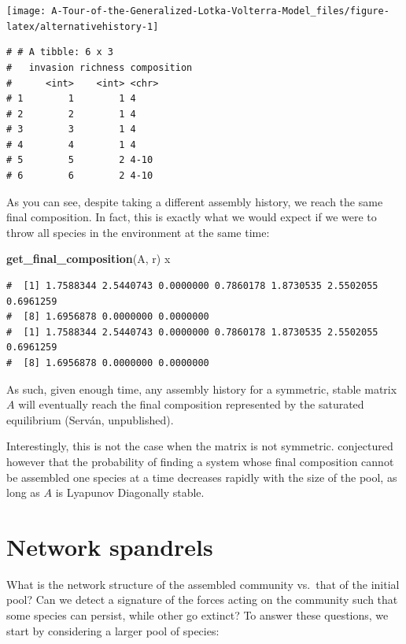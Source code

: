 \documentclass[]{book}
\newenvironment{Shaded}{\begin{snugshade}}{\end{snugshade}}
\newcommand{\KeywordTok}[1]{\textcolor[rgb]{0.13,0.29,0.53}{\textbf{#1}}}
\newcommand{\NormalTok}[1]{#1}
\begin{document}
\begin{center}\texttt{[image: A-Tour-of-the-Generalized-Lotka-Volterra-Model\_files/figure-latex/alternativehistory-1]} \end{center}

\begin{verbatim}
# # A tibble: 6 x 3
#   invasion richness composition
#      <int>    <int> <chr>      
# 1        1        1 4          
# 2        2        1 4          
# 3        3        1 4          
# 4        4        1 4          
# 5        5        2 4-10       
# 6        6        2 4-10
\end{verbatim}

As you can see, despite taking a different assembly history, we reach the same final composition. In fact, this is exactly what we would expect if we were to throw all species in the environment at the same time:

\begin{Shaded}
\begin{Highlighting}[]
\KeywordTok{get_final_composition}\NormalTok{(A, r)}
\NormalTok{x}
\end{Highlighting}
\end{Shaded}

\begin{verbatim}
#  [1] 1.7588344 2.5440743 0.0000000 0.7860178 1.8730535 2.5502055 0.6961259
#  [8] 1.6956878 0.0000000 0.0000000
#  [1] 1.7588344 2.5440743 0.0000000 0.7860178 1.8730535 2.5502055 0.6961259
#  [8] 1.6956878 0.0000000 0.0000000
\end{verbatim}

As such, given enough time, any assembly history for a symmetric, stable matrix \(A\) will eventually reach the final composition represented by the saturated equilibrium (Serván, unpublished).

Interestingly, this is not the case when the matrix is not symmetric. \citet{servan2018coexistence} conjectured however that the probability of finding a system whose final composition cannot be assembled one species at a time decreases rapidly with the size of the pool, as long as \(A\) is Lyapunov Diagonally stable.

\hypertarget{network-spandrels}{%
\section{Network spandrels}\label{network-spandrels}}

What is the network structure of the assembled community vs.~that of the initial pool? Can we detect a signature of the forces acting on the community such that some species can persist, while other go extinct? To answer these questions, we start by considering a larger pool of species:
\end{document}
